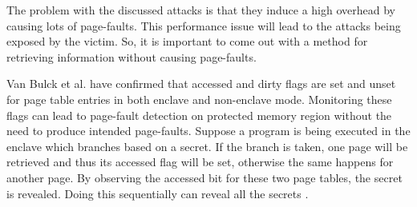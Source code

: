 \begin{figure}[htp]
	\centering
	\quad
	\caption{}
\end{figure}

The problem with the discussed attacks is that they induce a high overhead by causing lots of page-faults. This performance issue will lead to the attacks being exposed by the victim. So, it is important to come out with a method for retrieving information without causing page-faults.

Van Bulck et al. \cite{stealthy} have confirmed that accessed and dirty flags are set and unset for page table entries in both enclave and non-enclave mode. Monitoring these flags can lead to page-fault detection on protected memory region without the need to produce intended page-faults. Suppose a program is being executed in the enclave which branches based on a secret. If the branch is taken, one page will be retrieved and thus its accessed flag will be set, otherwise the same happens for another page. By observing the accessed bit for these two page tables, the secret is revealed. Doing this sequentially can reveal all the secrets \cite{stealthy}.

